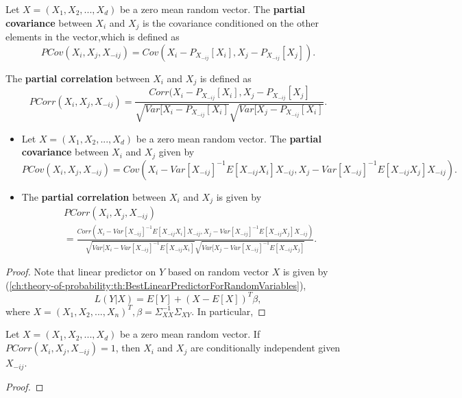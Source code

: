 \begin{refsection}
\begin{definition}\cite[96]{subbaRao2017timeSeries}
Let $X = (X_1,X_2,...,X_d)$ be a zero mean random vector. The \textbf{partial covariance} between $X_i$ and $X_j$ is the covariance conditioned on the other elements in the vector,which is defined  as
	$$PCov(X_i,X_j,X_{-ij}) = Cov(X_i - P_{X_{-ij}}[X_i],X_j-P_{X_{-ij}}[X_j]).$$
	
The \textbf{partial correlation} 	between $X_i$ and $X_j$ is  defined  as
$$PCorr(X_i,X_j,X_{-ij}) = \frac{Corr(X_i - P_{X_{-ij}}[X_i],X_j-P_{X_{-ij}}[X_j]}{\sqrt{Var[X_i - P_{X_{-ij}}[X_i]}\sqrt{Var[X_j - P_{X_{-ij}}[X_i]}}.$$	
\end{definition}



\begin{theorem}\hfill
\begin{itemize}
	\item Let $X = (X_1,X_2,...,X_d)$ be a zero mean random vector. The \textbf{partial covariance} between $X_i$ and $X_j$ given by
	$$PCov(X_i,X_j,X_{-ij}) = Cov(X_i - Var[X_{-ij}]^{-1}E[X_{-ij}X_i]X_{-ij},X_j-Var[X_{-ij}]^{-1}E[X_{-ij}X_j]X_{-ij}).$$
	\item 	The \textbf{partial correlation} 	between $X_i$ and $X_j$ is  given by
	\begin{align*}
	& PCorr(X_i,X_j,X_{-ij}) \\
	& = \frac{Corr(X_i - Var[X_{-ij}]^{-1}E[X_{-ij}X_i]X_{-ij},X_j-Var[X_{-ij}]^{-1}E[X_{-ij}X_j]X_{-ij})}{\sqrt{Var[X_i - Var[X_{-ij}]^{-1}E[X_{-ij}X_i]}\sqrt{Var[X_j - Var[X_{-ij}]^{-1}E[X_{-ij}X_j]}}.
	\end{align*}
\end{itemize}	
\end{theorem}
\begin{proof}
Note that linear predictor on $Y$ based on random vector $X$ is given by (\autoref{ch:theory-of-probability:th:BestLinearPredictorForRandomVariables}),
 $$L(Y|X) = E[Y] + (X-E[X])^T\beta,$$
 where $X = (X_1,X_2,...,X_n)^T, \beta = \Sigma_{XX}^{-1}\Sigma_{XY}$.
 In particular,
\end{proof}


\begin{lemma}
Let $X = (X_1,X_2,...,X_d)$ be a zero mean random vector.  If $PCorr(X_i,X_j,X_{-ij}) = 1$, then $X_i$ and $X_j$ are conditionally independent given $X_{-ij}$.
\end{lemma}
\begin{proof}
	

\end{proof}
\end{refsection}
